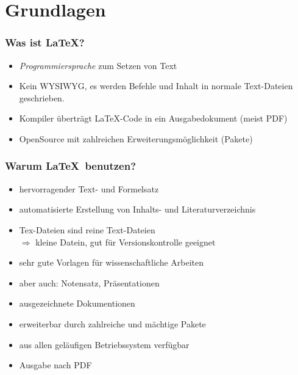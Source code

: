 \section{Grundlagen}
\begin{frame}
    \frametitle{Was ist \LaTeX?}
    \begin{itemize}
        \item \emph{Programmiersprache} zum Setzen von Text
        \item Kein WYSIWYG, es werden Befehle und Inhalt in normale Text-Dateien geschrieben.
        \item Kompiler überträgt \LaTeX-Code in ein Ausgabedokument (meist PDF)
        \item OpenSource mit zahlreichen Erweiterungsmöglichkeit (Pakete)
    \end{itemize}
\end{frame}
\begin{frame}
    \frametitle{Warum \LaTeX \ benutzen?}
    \begin{itemize}
        \item hervorragender Text- und Formelsatz
        \item automatisierte Erstellung von Inhalts- und Literaturverzeichnis
        \item Tex-Dateien sind reine Text-Dateien \\
              $\Rightarrow$ kleine Datein, gut für Versionskontrolle geeignet
        \item sehr gute Vorlagen für wissenschaftliche Arbeiten 
        \item aber auch: Notensatz, Präsentationen 
        \item ausgezeichnete Dokumentionen
        \item erweiterbar durch zahlreiche und mächtige Pakete
        \item aus allen geläufigen Betriebssystem verfügbar
        \item Ausgabe nach PDF
    \end{itemize}
\end{frame}

